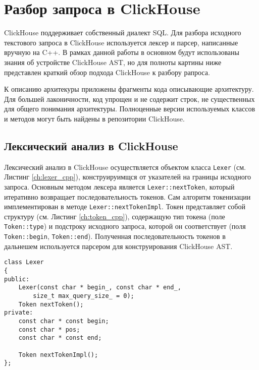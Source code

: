 \section{Разбор запроса в ClickHouse}
ClickHouse поддерживает собственный диалект SQL. Для разбора исходного текстового запроса в ClickHouse используется лексер и парсер, написанные вручную на C++. В рамках данной работы в основном будут использованы знания об устройстве ClickHouse AST, но для полноты картины ниже представлен краткий обзор подхода ClickHouse к разбору рапроса. 

К описанию архитекуры приложены фрагменты кода описывающие архитектуру. Для большей лаконичности, код упрощен и не содержит строк, не существенных для общего понимания архитектуры. Полноценные версии используемых классов и методов могут быть найдены в репозитории ClickHouse.  

\subsection{Лексический анализ в ClickHouse}

Лексический анализ в ClickHouse осуществляется объектом класса \lstinline[style=customcpp]|Lexer| (см. Листинг \ref{ch:lexer_cpp}), конструируимщся от указателей на границы исходного запроса. Основным методом лексера является \lstinline[style=customcpp]|Lexer::nextToken|, который итеративно возвращает последовательность токенов. Сам алгоритм токенизации имплементирован в методе \lstinline[style=customcpp]|Lexer::nextTokenImpl|. Токен представляет собой структуру (см. Листинг \ref{ch:token_cpp}), содержащую тип токена (поле \lstinline[style=customcpp]|Token::type|) и подстроку исходного запроса, которой он соответствует (поля \lstinline[style=customcpp]|Token::begin|, \lstinline[style=customcpp]|Token::end|). Полученная последовательность токенов в дальнешем используется парсером для конструирования ClickHouse AST.

\pagebreak

\begin{lstlisting}[style=customcpp, label={ch:lexer_cpp}, caption={Структура лексера в ClickHouse}, captionpos=b]
class Lexer
{
public:
    Lexer(const char * begin_, const char * end_,
        size_t max_query_size_ = 0);
    Token nextToken();
private:
    const char * const begin;
    const char * pos;
    const char * const end;

    Token nextTokenImpl();
};
\end{lstlisting}

